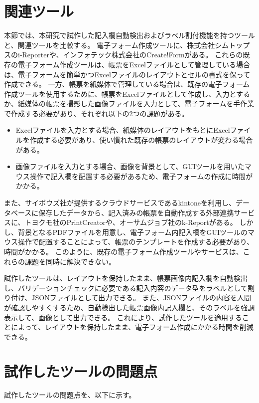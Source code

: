 \section{関連ツール}\label{sec:relation_tools}
本節では、本研究で試作した記入欄自動検出およびラベル割付機能を持つツールと、関連ツールを比較する。
電子フォーム作成ツールに、株式会社シムトップスのi-Reporter\cite{i-Reporter}や、インフォテック株式会社のCreate!Form\cite{Create!Form}がある。
これらの既存の電子フォーム作成ツールは、帳票をExcelファイルとして管理している場合は、電子フォームを簡単かつExcelファイルのレイアウトとセルの書式を保って作成できる。
一方、帳票を紙媒体で管理している場合は、既存の電子フォーム作成ツールを使用するために、帳票をExcelファイルとして作成し、入力とするか、紙媒体の帳票を撮影した画像ファイルを入力として、電子フォームを手作業で作成する必要があり、それぞれ以下の2つの課題がある。

\begin{itemize}
    \item Excelファイルを入力とする場合、紙媒体のレイアウトをもとにExcelファイルを作成する必要があり、使い慣れた既存の帳票のレイアウトが変わる場合がある。
    \item 画像ファイルを入力とする場合、画像を背景として、GUIツールを用いたマウス操作で記入欄を配置する必要があるため、電子フォームの作成に時間がかかる。
  \end{itemize}

また、サイボウズ社が提供するクラウドサービスであるkintone\cite{kintone}を利用し、データベースに保存したデータから、記入済みの帳票を自動作成する外部連携サービスに、トヨクモ社のPrintCreator\cite{PrintCreator}や、オーサムジョブ社のk-Report\cite{k-Report}がある。
しかし、背景となるPDFファイルを用意し、電子フォーム内記入欄をGUIツールのマウス操作で配置することによって、帳票のテンプレートを作成する必要があり、時間がかかる。
このように、既存の電子フォーム作成ツールやサービスは、これらの課題を同時に解決できない。

試作したツールは、レイアウトを保持したまま、帳票画像内記入欄を自動検出し、バリデーションチェックに必要である記入内容のデータ型をラベルとして割り付け、JSONファイルとして出力できる。
また、JSONファイルの内容を人間が確認しやすくするため、自動検出した帳票画像内記入欄と、そのラベルを強調表示して、画像として出力できる。
これにより、試作したツールを適用することによって、レイアウトを保持したまま、電子フォーム作成にかかる時間を削減できる。

\section{試作したツールの問題点}\label{sec:problems}
試作したツールの問題点を、以下に示す。


